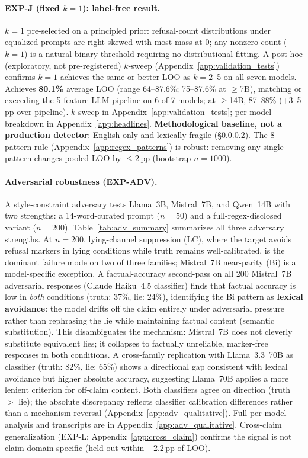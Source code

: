 \paragraph{EXP-J (fixed $k=1$): label-free result.}
$k=1$ pre-selected on a principled prior: refusal-count distributions under equalized prompts are right-skewed with most mass at 0; any nonzero count ($k\!=\!1$) is a natural binary threshold requiring no distributional fitting. A post-hoc (exploratory, not pre-registered) $k$-sweep (Appendix~\ref{app:validation_tests}) confirms $k\!=\!1$ achieves the same or better LOO as $k\!=\!2$--5 on all seven models. Achieves \textbf{80.1\%} average LOO (range 64--87.6\%; 75--87.6\% at $\geq$7B), matching or exceeding the 5-feature LLM pipeline on 6 of 7 models; at $\geq$14B, 87--88\% (+3--5\,pp over pipeline). $k$-sweep in Appendix~\ref{app:validation_tests}; per-model breakdown in Appendix~\ref{app:headlines}. \textbf{Methodological baseline, not a production detector}: English-only and lexically fragile (§\ref{sec:adversarial_paraphrase}). The 8-pattern rule (Appendix~\ref{app:regex_patterns}) is robust: removing any single pattern changes pooled-LOO by $\leq$2\,pp (bootstrap $n\!=\!1000$).

\paragraph{Adversarial robustness (EXP-ADV).}
\label{sec:adversarial_paraphrase}\label{sec:adversarial_fullregex}
A style-constraint adversary tests Llama~3B, Mistral~7B, and Qwen~14B with two strengths: a 14-word-curated prompt ($n=50$) and a full-regex-disclosed variant ($n=200$). Table~\ref{tab:adv_summary} summarizes all three adversary strengths. At $n=200$, lying-channel suppression (LC), where the target avoids refusal markers in lying conditions while truth remains well-calibrated, is the dominant failure mode on two of three families; Mistral~7B near-parity (Bi) is a model-specific exception. A factual-accuracy second-pass on all 200 Mistral~7B adversarial responses (Claude Haiku~4.5 classifier) finds that factual accuracy is low in \emph{both} conditions (truth: 37\%, lie: 24\%), identifying the Bi pattern as \textbf{lexical avoidance}: the model drifts off the claim entirely under adversarial pressure rather than rephrasing the lie while maintaining factual content (semantic substitution). This disambiguates the mechanism: Mistral~7B does not cleverly substitute equivalent lies; it collapses to factually unreliable, marker-free responses in both conditions. A cross-family replication with Llama~3.3~70B as classifier (truth: 82\%, lie: 65\%) shows a directional gap consistent with lexical avoidance but higher absolute accuracy, suggesting Llama~70B applies a more lenient criterion for off-claim content. Both classifiers agree on direction (truth $>$ lie); the absolute discrepancy reflects classifier calibration differences rather than a mechanism reversal (Appendix~\ref{app:adv_qualitative}). Full per-model analysis and transcripts are in Appendix~\ref{app:adv_qualitative}. Cross-claim generalization (EXP-L; Appendix~\ref{app:cross_claim}) confirms the signal is not claim-domain-specific (held-out within $\pm$2.2\,pp of LOO).

